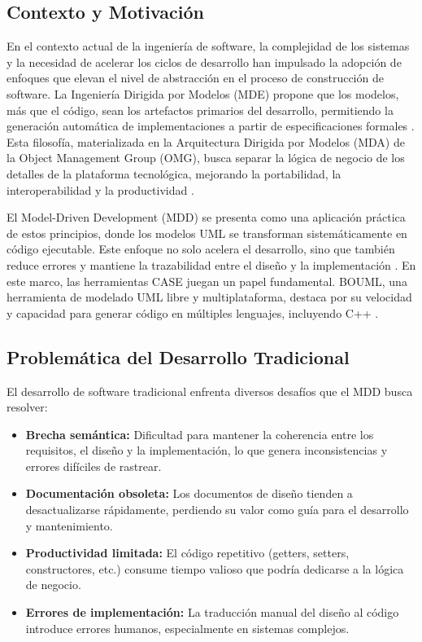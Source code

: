 \documentclass[12pt,a4paper]{article}
\begin{document}
\subsection{Contexto y Motivación}

En el contexto actual de la ingeniería de software, la complejidad de los sistemas y la necesidad de acelerar los ciclos de desarrollo han impulsado la adopción de enfoques que elevan el nivel de abstracción en el proceso de construcción de software. La Ingeniería Dirigida por Modelos (MDE) propone que los modelos, más que el código, sean los artefactos primarios del desarrollo, permitiendo la generación automática de implementaciones a partir de especificaciones formales \cite{schmidt2006}. Esta filosofía, materializada en la Arquitectura Dirigida por Modelos (MDA) de la Object Management Group (OMG), busca separar la lógica de negocio de los detalles de la plataforma tecnológica, mejorando la portabilidad, la interoperabilidad y la productividad \cite{omg2014}.

El Model-Driven Development (MDD) se presenta como una aplicación práctica de estos principios, donde los modelos UML se transforman sistemáticamente en código ejecutable. Este enfoque no solo acelera el desarrollo, sino que también reduce errores y mantiene la trazabilidad entre el diseño y la implementación \cite{selic2003}. En este marco, las herramientas CASE juegan un papel fundamental. BOUML, una herramienta de modelado UML libre y multiplataforma, destaca por su velocidad y capacidad para generar código en múltiples lenguajes, incluyendo C++ \cite{bouml}.

\subsection{Problemática del Desarrollo Tradicional}

El desarrollo de software tradicional enfrenta diversos desafíos que el MDD busca resolver:

\begin{itemize}
    \item \textbf{Brecha semántica:} Dificultad para mantener la coherencia entre los requisitos, el diseño y la implementación, lo que genera inconsistencias y errores difíciles de rastrear.
    \item \textbf{Documentación obsoleta:} Los documentos de diseño tienden a desactualizarse rápidamente, perdiendo su valor como guía para el desarrollo y mantenimiento.
    \item \textbf{Productividad limitada:} El código repetitivo (getters, setters, constructores, etc.) consume tiempo valioso que podría dedicarse a la lógica de negocio.
    \item \textbf{Errores de implementación:} La traducción manual del diseño al código introduce errores humanos, especialmente en sistemas complejos.
\end{itemize}
\end{document}
